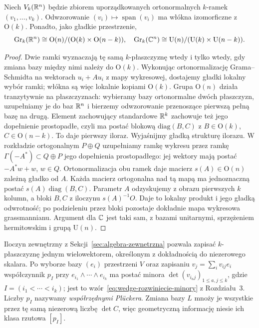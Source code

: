 \begin{stwierdzenie}
\label{prop:grass-stiefel}
Niech $V_k(\mathbb{R}^n)$ będzie zbiorem uporządkowanych
ortonormalnych $k$-ramek $(v_1,\ldots,v_k)$.
Odwzorowanie $(v_i)\mapsto\operatorname{span}(v_i)$ ma
włókna izomorficzne z $\mathrm O(k)$.
Ponadto, jako gładkie przestrzenie,
\[
 \operatorname{Gr}_k(\mathbb{R}^n)
   \cong\mathrm O(n)/(\mathrm O(k)\times\mathrm O(n-k)),
\quad
 \operatorname{Gr}_k(\mathbb{C}^n)
   \cong\mathrm U(n)/(\mathrm U(k)\times\mathrm U(n-k)).
\]
\end{stwierdzenie}
\begin{proof}
Dwie ramki wyznaczają tę samą $k$-płaszczyznę wtedy
i tylko wtedy, gdy zmiana bazy między nimi należy do
$\mathrm O(k)$. Wykonując ortonormalizację Grama--Schmidta
na wektorach $u_i+Au_i$ z mapy wykresowej, dostajemy
gładki lokalny wybór ramki; włókna są więc lokalnie
kopiami $\mathrm O(k)$. Grupa $\mathrm O(n)$ działa
tranzytywnie na płaszczyznach: wybieramy bazy ortonormalne
dwóch płaszczyzn, uzupełniamy je do baz $\mathbb{R}^n$ i bierzemy
odwzorowanie przenoszące pierwszą pełną bazę na drugą.
Element zachowujący standardowe $\mathbb{R}^k$ zachowuje też
jego dopełnienie prostopadłe, czyli ma postać blokową
$\mathrm{diag}(B,C)$ z $B\in\mathrm O(k)$,
$C\in\mathrm O(n-k)$. To daje pierwszy iloraz.
Wyjaśnijmy gładką strukturę ilorazu. W rozkładzie ortogonalnym
$P\oplus Q$ uzupełniamy ramkę wykresu przez ramkę
$\Gamma(-A^*)\subset Q\oplus P$ jego dopełnienia prostopadłego:
jej wektory mają postać $-A^*w+w$, $w\in Q$.
Ortonormalizacja obu ramek daje macierz $s(A)\in\mathrm O(n)$
zależną gładko od $A$. Każda macierz ortogonalna nad tą mapą
ma jednoznaczną postać $s(A)\operatorname{diag}(B,C)$.
Parametr $A$ odzyskujemy z obrazu pierwszych $k$ kolumn,
a bloki $B,C$ z iloczynu $s(A)^{-1}O$. Daje to lokalny
produkt i jego gładką odwrotność; po podzieleniu przez bloki
pozostaje dokładnie mapa wykresowa grassmannianu.
Argument dla $\mathbb{C}$ jest taki sam, z bazami unitarnymi,
sprzężeniem hermitowskim i grupą $\mathrm U(n)$.
\end{proof}

Iloczyn zewnętrzny z Sekcji~\ref{sec:algebra-zewnetrzna}
pozwala zapisać $k$-płaszczyznę jednym wielowektorem,
określonym z dokładnością do niezerowego skalara.
Po wyborze bazy $(e_i)$ przestrzeni $V$ oraz zapisaniu
$v_j=\sum_i v_{ij}e_i$ współczynnik
$p_I$ przy $e_{i_1}\wedge\cdots\wedge e_{i_k}$
ma postać minora
$\det(v_{i_a j})_{1\leq a,j\leq k}$, gdzie
$I=(i_1<\cdots<i_k)$; jest to
wzór~\eqref{eq:wedge-rozwiniecie-minory} z Rozdziału~3.
Liczby $p_I$ nazywamy \emph{współrzędnymi Plückera}.
Zmiana bazy $L$ mnoży je wszystkie przez tę samą
niezerową liczbę $\det C$, więc geometryczną informację
niesie ich klasa rzutowa $[p_I]$.

